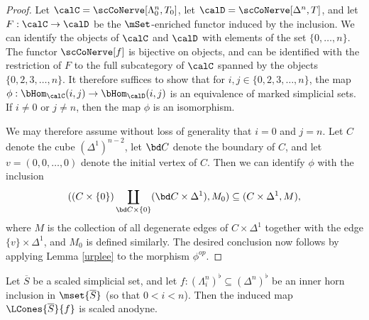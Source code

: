 \begin{proof}
Let $\calC = \scCoNerve[ \Lambda^n_0, T_0]$, let $\calD = \scCoNerve[ \Delta^n, T]$, and let
$F: \calC \rightarrow \calD$ be the $\mSet$-enriched functor induced by the inclusion.
We can identify the objects of $\calC$ and $\calD$ with elements of the set
$\{ 0, \ldots, n \}$. The functor $\scCoNerve[f]$ is bijective on objects, and can be identified
with the restriction of $F$ to the full subcategory of $\calC$ spanned by the objects
$\{0, 2, 3, \ldots, n \}$. It therefore suffices to show that for $i,j \in \{0, 2, 3, \ldots, n \}$, 
the map $\phi: \bHom_{\calC}(i,j) \rightarrow \bHom_{\calD}(i,j)$ is an equivalence of marked simplicial sets. If $i \neq 0$ or $j \neq n$, then the map $\phi$ is an isomorphism. 

We may therefore assume without loss of generality that $i = 0$ and $j=n$. Let
$C$ denote the cube $(\Delta^1)^{n-2}$, let $\bd C$ denote the boundary of $C$, and let
$v = (0, 0, \ldots, 0)$ denote the initial vertex of $C$. Then we can identify $\phi$ with the inclusion
$$ ((C \times \{0\}) \coprod_{ \bd C \times \{0\} } ( \bd C \times \Delta^1), M_0)
\subseteq (C \times \Delta^1, M),$$
where $M$ is the collection of all degenerate edges of $C \times \Delta^1$ together
with the edge $\{v\} \times \Delta^1$, and $M_0$ is defined similarly. The desired conclusion now follows by applying Lemma \ref{urplee} to the morphism $\phi^{op}$.
\end{proof}

\begin{lemma}\label{swww}
Let $\overline{S}$ be a scaled simplicial set, and let
$f: ( \Lambda^n_i)^{\flat} \subseteq (\Delta^n)^{\flat}$ be an inner horn inclusion
in $\mset{\overline{S}}$ (so that $0 < i < n$). Then the induced map $\LCones{\overline{S}}{f}$ is scaled anodyne.
\end{lemma}

